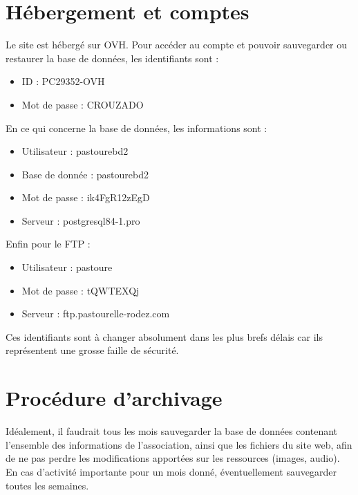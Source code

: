 \documentclass[11pt]{report}
\begin{document}
\section{Hébergement et comptes}
Le site est hébergé sur OVH. Pour accéder au compte et pouvoir sauvegarder ou
restaurer la base de données, les identifiants sont : \\
\begin{itemize}
\item ID : PC29352-OVH
\item Mot de passe : CROUZADO \\
\end{itemize}

\par En ce qui concerne la base de données, les informations sont : \\
\begin{itemize}
\item Utilisateur : pastourebd2
\item Base de donnée : pastourebd2
\item Mot de passe :  ik4FgR12zEgD
\item Serveur : postgresql84-1.pro \\
\end{itemize}

\par Enfin pour le FTP : \\
\begin{itemize}
\item Utilisateur : pastoure
\item Mot de passe :  tQWTEXQj
\item Serveur : ftp.pastourelle-rodez.com \\
\end{itemize}

\par Ces identifiants sont à changer absolument dans les plus brefs délais car 
ils représentent une grosse faille de sécurité.


\section{Procédure d'archivage}
Idéalement, il faudrait tous les mois sauvegarder la base de données contenant
l'ensemble des informations de l'association, ainsi que les fichiers du site
web, afin de ne pas perdre les modifications apportées sur les ressources
(images, audio). En cas d'activité importante pour un mois donné, 
éventuellement sauvegarder toutes les semaines.
\end{document}
